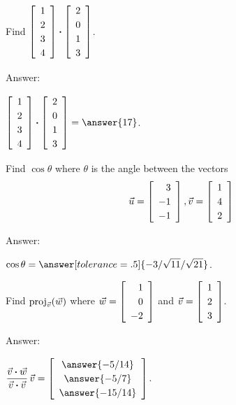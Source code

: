 \documentclass{ximera}
\author{Zack Reed}
\begin{document}
\begin{problem}
    Find $\startmat{r}
      1 \\
      2 \\
      3 \\
      4
    \stopmat \dotprod \startmat{r}
      2 \\
      0 \\
      1 \\
      3
    \stopmat$.
    
    Answer:

      $\startmat{r}
        1 \\
        2 \\
        3 \\
        4
      \stopmat \dotprod \startmat{r}
        2 \\
        0 \\
        1 \\
        3
      \stopmat = \answer{17}$.
    
  \end{problem}
  

  
  \begin{problem}
    Find $\cos \theta$ where $\theta$ is the angle between the vectors
    \begin{equation*}
      \vect{u}
      =
      \startmat{r}
        3 \\
        -1 \\
        -1
      \stopmat,
      \vect{v}
      =
      \startmat{r}
        1 \\
        4 \\
        2
      \stopmat
    \end{equation*}
    
    Answer:
    
      $\displaystyle\cos\theta=\answer[tolerance=.5]{-3/\sqrt{11}/\sqrt{21}}$.

  \end{problem}
  
  \begin{problem}
    Find $\text{proj}_{\vec{v}}(\vec{w})$ where
    $\vect{w}=\startmat{r}
      1 \\
      0 \\
      -2
    \stopmat$ and $\vect{v}=\startmat{r}
      1 \\
      2 \\
      3
    \stopmat$.
    
    Answer:

      $\displaystyle
      \def\arraystretch{1.2}
      \frac{\vect{v}\dotprod \vect{w}}{\vect{v}\dotprod
        \vect{v}}\,\vect{v}=\startmat{c}
        \answer{-5/14} \\
        \answer{-5/7} \\
        \answer{-15/14}
      \stopmat$.
    
  \end{problem}
  
\end{document}
